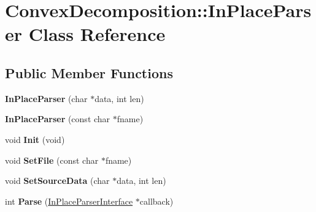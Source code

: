 \hypertarget{class_convex_decomposition_1_1_in_place_parser}{\section{Convex\+Decomposition\+:\+:In\+Place\+Parser Class Reference}
\label{class_convex_decomposition_1_1_in_place_parser}
}
\subsection*{Public Member Functions}
\begin{DoxyCompactItemize}
\item 
\hypertarget{class_convex_decomposition_1_1_in_place_parser_a6b50b52a97d1345c7a4b5c6c1b439d20}{{\bfseries In\+Place\+Parser} (char $\ast$data, int len)}\label{class_convex_decomposition_1_1_in_place_parser_a6b50b52a97d1345c7a4b5c6c1b439d20}

\item 
\hypertarget{class_convex_decomposition_1_1_in_place_parser_aaee50edc864e77d9cb615019d8ffd1ed}{{\bfseries In\+Place\+Parser} (const char $\ast$fname)}\label{class_convex_decomposition_1_1_in_place_parser_aaee50edc864e77d9cb615019d8ffd1ed}

\item 
\hypertarget{class_convex_decomposition_1_1_in_place_parser_a09692ae6c3410d03156ce4208fc2b24f}{void {\bfseries Init} (void)}\label{class_convex_decomposition_1_1_in_place_parser_a09692ae6c3410d03156ce4208fc2b24f}

\item 
\hypertarget{class_convex_decomposition_1_1_in_place_parser_a990135c1969cc51f3115c8ed1beb0774}{void {\bfseries Set\+File} (const char $\ast$fname)}\label{class_convex_decomposition_1_1_in_place_parser_a990135c1969cc51f3115c8ed1beb0774}

\item 
\hypertarget{class_convex_decomposition_1_1_in_place_parser_a3347cf18dc0d9a2060e4c8eb9dae8b71}{void {\bfseries Set\+Source\+Data} (char $\ast$data, int len)}\label{class_convex_decomposition_1_1_in_place_parser_a3347cf18dc0d9a2060e4c8eb9dae8b71}

\item 
\hypertarget{class_convex_decomposition_1_1_in_place_parser_ac53ee6e981575515431579824594983d}{int {\bfseries Parse} (\hyperlink{class_convex_decomposition_1_1_in_place_parser_interface}{In\+Place\+Parser\+Interface} $\ast$callback)}\label{class_convex_decomposition_1_1_in_place_parser_ac53ee6e981575515431579824594983d}


\end{DoxyCompactItemize}
